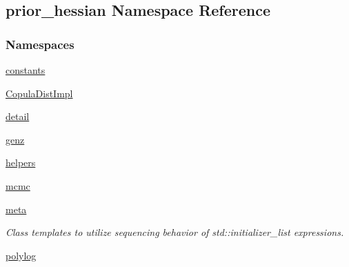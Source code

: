 \hypertarget{namespaceprior__hessian}{}\subsection{prior\+\_\+hessian Namespace Reference}
\label{namespaceprior__hessian}
\subsubsection*{Namespaces}
\begin{DoxyCompactItemize}
\item 
 \hyperlink{namespaceprior__hessian_1_1constants}{constants}
\item 
 \hyperlink{namespaceprior__hessian_1_1CopulaDistImpl}{Copula\+Dist\+Impl}
\item 
 \hyperlink{namespaceprior__hessian_1_1detail}{detail}
\item 
 \hyperlink{namespaceprior__hessian_1_1genz}{genz}
\item 
 \hyperlink{namespaceprior__hessian_1_1helpers}{helpers}
\item 
 \hyperlink{namespaceprior__hessian_1_1mcmc}{mcmc}
\item 
 \hyperlink{namespaceprior__hessian_1_1meta}{meta}
\begin{DoxyCompactList}\small\item\em Class templates to utilize sequencing behavior of std\+::initializer\+\_\+list expressions. \end{DoxyCompactList}\item 
 \hyperlink{namespaceprior__hessian_1_1polylog}{polylog}
\end{DoxyCompactItemize}
